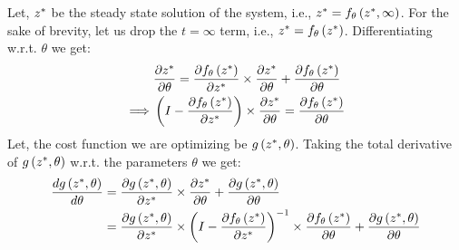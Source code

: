 Let, $z^*$ be the steady state solution of the system, i.e., $z^* = f_\theta\left(z^*, \infty\right)$. For the sake of brevity, let us drop the $t = \infty$ term, i.e., $z^* = f_\theta\left(z^*\right)$. Differentiating w.r.t. $\theta$ we get:
%
\begin{align}
           & \frac{\partial z^*}{\partial \theta} = \frac{\partial f_\theta\left(z^*\right)}{\partial z^*} \times \frac{\partial z^*}{\partial \theta} + \frac{\partial f_\theta\left(z^*\right)}{\partial \theta} \\
  \implies & \left( I - \frac{\partial f_\theta\left(z^*\right)}{\partial z^*} \right) \times \frac{\partial z^*}{\partial \theta} = \frac{\partial f_\theta\left(z^*\right)}{\partial \theta}
\end{align}
%
Let, the cost function we are optimizing be $g\left(z^*, \theta\right)$. Taking the total derivative of $g\left(z^*, \theta\right)$ w.r.t. the parameters $\theta$ we get:
%
\begin{align}
  \frac{d g\left(z^*, \theta\right)}{d \theta} & = \frac{\partial g\left(z^*, \theta\right)}{\partial z^*} \times \frac{\partial z^*}{\partial \theta} + \frac{\partial g\left(z^*, \theta\right)}{\partial \theta}                                                                                                                                 \\
                                              & = \frac{\partial g\left(z^*, \theta\right)}{\partial z^*} \times \left( I - \frac{\partial f_\theta\left(z^*\right)}{\partial z^*} \right)^{-1} \times \frac{\partial f_\theta\left(z^*\right)}{\partial \theta} + \frac{\partial g\left(z^*, \theta\right)}{\partial \theta} \label{eq:ss_gradient}
\end{align}
%
